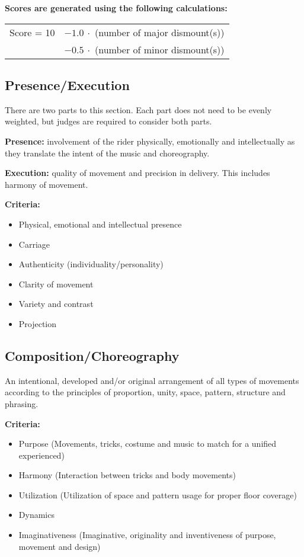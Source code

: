 \textbf{Scores are generated using the following calculations:}

\begin{tabular}{r l}
Score = 10 & $- 1.0\ \cdot$ (number of major dismount(s)) \\
 & $- 0.5\ \cdot$ (number of minor dismount(s)) \\
\end{tabular}


\subsection{Presence/Execution \label{subsec:freestyle_individual-performance-score_presence-execution}}
There are two parts to this section.
Each part does not need to be evenly weighted, but judges are required to consider both parts.

\textbf{Presence:} involvement of the rider physically, emotionally and intellectually as they translate the intent of the music and choreography.

\textbf{Execution:} quality of movement and precision in delivery.
This includes harmony of movement.

\textbf{Criteria:}
\begin{itemize}
\item Physical, emotional and intellectual presence
\item Carriage
\item Authenticity (individuality/personality)
\item Clarity of movement
\item Variety and contrast
\item Projection
\end{itemize}

\subsection{Composition/Choreography}
An intentional, developed and/or original arrangement of all types of movements according to the principles of proportion, unity, space, pattern, structure and phrasing.

\textbf{Criteria:}
\begin{itemize}
\item Purpose (Movements, tricks, costume and music to match for a unified experienced)
\item Harmony (Interaction between tricks and body movements)
\item Utilization (Utilization of space and pattern usage for proper floor coverage)
\item Dynamics
\item Imaginativeness (Imaginative, originality and inventiveness of purpose, movement and design)
\end{itemize}

